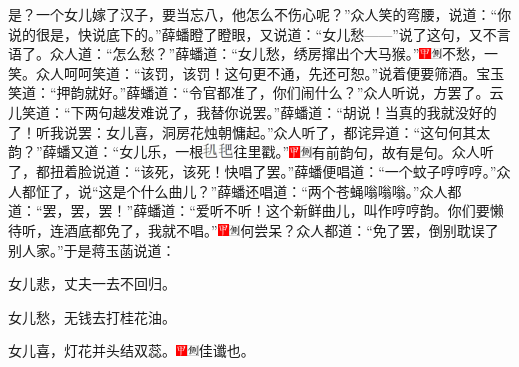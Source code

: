 是？一个女儿嫁了汉子，要当忘八，他怎么不伤心呢？''众人笑的弯腰，说道：``你说的很是，快说底下的。''薛蟠瞪了瞪眼，又说道：``女儿愁------''说了这句，又不言语了。众人道：``怎么愁？''薛蟠道：``女儿愁，绣房撺出个大马猴。''{\includegraphics[width=3mm]{../Images/00002}\includegraphics[width=3mm]{../Images/00011}\footnotesize \kaishu 不愁，一笑。}众人呵呵笑道：``该罚，该罚！这句更不通，先还可恕。''说着便要筛酒。宝玉笑道：``押韵就好。''薛蟠道：``令官都准了，你们闹什么？''众人听说，方罢了。云儿笑道：``下两句越发难说了，我替你说罢。''薛蟠道：``胡说！当真的我就没好的了！听我说罢：女儿喜，洞房花烛朝慵起。''众人听了，都诧异道：``这句何其太韵？''薛蟠又道：``女儿乐，一根\includegraphics[width=8mm]{../images/00022}往里戳。''{\includegraphics[width=3mm]{../Images/00002}\includegraphics[width=3mm]{../Images/00011}\footnotesize \kaishu 有前韵句，故有是句。}众人听了，都扭着脸说道：``该死，该死！快唱了罢。''薛蟠便唱道：``一个蚊子哼哼哼。''众人都怔了，说``这是个什么曲儿？''薛蟠还唱道：``两个苍蝇嗡嗡嗡。''众人都道：``罢，罢，罢！''薛蟠道：``爱听不听！这个新鲜曲儿，叫作哼哼韵。你们要懒待听，连酒底都免了，我就不唱。''{\includegraphics[width=3mm]{../Images/00002}\includegraphics[width=3mm]{../Images/00011}\footnotesize \kaishu 何尝呆？}众人都道：``免了罢，倒别耽误了别人家。''于是蒋玉菡说道：

女儿悲，丈夫一去不回归。

女儿愁，无钱去打桂花油。

女儿喜，灯花并头结双蕊。{\includegraphics[width=3mm]{../Images/00002}\includegraphics[width=3mm]{../Images/00011}\footnotesize \kaishu 佳谶也。}

